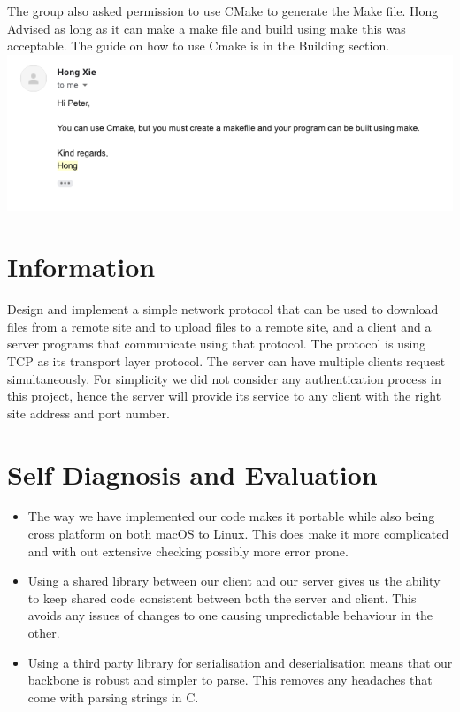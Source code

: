 \documentclass{article}
\begin{document}
The group also asked permission to use CMake to generate the Make file. Hong Advised as long as it can make a make file and build using make this was acceptable. The guide on how to use Cmake is in the Building section.\\
\includegraphics[width=\textwidth]{make}

\section{Information}
Design and implement a simple network protocol that can be used to download files from a remote site and to upload files to a remote site, and a client and a server programs that communicate using that protocol. The protocol is using TCP as its transport layer protocol. The server can have multiple clients request simultaneously. For simplicity we did not consider any authentication process in this project, hence the server will provide its service to any client with the right site address and port number.

\section{Self Diagnosis and Evaluation}
\begin{itemize}
\item The way we have implemented our code makes it portable while also being cross platform on both macOS to Linux. This does make it more complicated and with out extensive checking possibly more error prone.
\item Using a shared library between our client and our server gives us the ability to keep shared code consistent between both the server and client. This avoids any issues of changes to one causing unpredictable behaviour in the other.
\item Using a third party library for serialisation and deserialisation means that our backbone is robust and simpler to parse. This removes any headaches that come with parsing strings in C.
\end{itemize}
\end{document}

